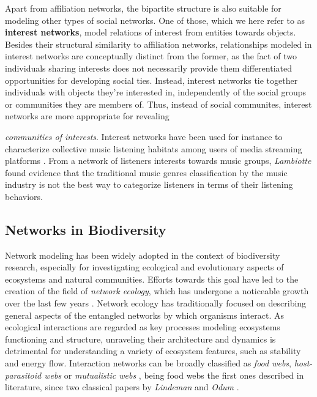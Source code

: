 Apart from affiliation networks, the bipartite structure is also suitable for modeling other types of social networks.
One of those, which we here refer to as \textbf{interest networks}, model relations of interest from entities towards objects.
Besides their structural similarity to affiliation networks, relationships modeled in interest networks are conceptually distinct from the former, as the fact of two individuals sharing interests does not necessarily provide them differentiated opportunities for developing social ties.
Instead, interest networks tie together individuals with objects they're interested in, independently of the social groups or communities they are members of. 
Thus, instead of social communites, interest networks are more appropriate for revealing {\textit{communities of interests}.
%
Interest networks have been used for instance to characterize collective music listening habitats among users of media streaming platforms \cite{Lambiotte2005}.
From a network of listeners interests towards music groups, \textit{Lambiotte} found evidence that the traditional music genres classification by the music industry is not the best way to categorize listeners in terms of their listening behaviors.



\subsection{Networks in Biodiversity}
Network modeling has been widely adopted in the context of biodiversity research, especially for investigating ecological and evolutionary aspects of ecosystems and natural communities. 
Efforts towards this goal have led to the creation of the field of \textit{network ecology}, which has undergone a noticeable growth over the last few years \cite{Borrett2014}.
Network ecology has traditionally focused on describing general aspects of the entangled networks by which organisms interact.
As ecological interactions are regarded as key processes modeling ecosystems functioning and structure, unraveling their architecture and dynamics is detrimental for understanding a variety of ecosystem features, such as stability and energy flow.
%
Interaction networks can be broadly classified as \textit{food webs}, \textit{host-parasitoid webs} or \textit{mutualistic webs} \cite{Ings2009}, being food webs the first ones described in literature, since two classical papers by \textit{Lindeman} and \textit{Odum} \cite{lindeman1942trophic, odum1956primary}. 
%

}
